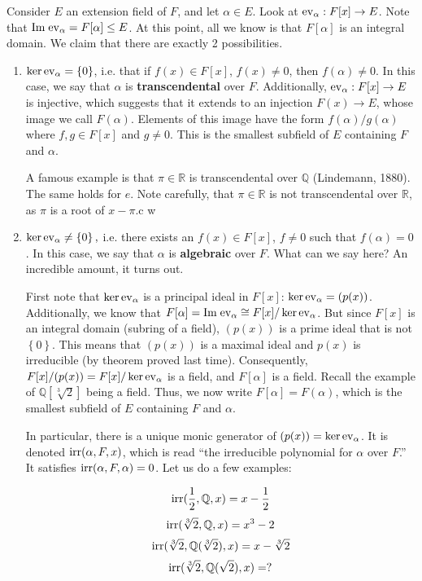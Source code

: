 \documentclass{../mathnotes}
\begin{document}
Consider $E$ an extension field of $F$, and let $\alpha\in E$. Look at ${\rm ev}_\alpha: F[x]\to E$. Note that ${\rm Im\;} {\rm ev}_\alpha=F[\alpha]\leq E$.
At this point, all we know is that $F[\alpha]$ is an integral domain. We claim that there are exactly 2 possibilities.
\begin{enumerate}
    \item $\ker {\rm ev}_\alpha=\left\{ 0 \right\}$, i.e. that if $f(x)\in F[x]$, $f(x)\neq 0$, then $f(\alpha)\neq 0$.
        In this case, we say that $\alpha$ is \textbf{transcendental} over $F$. Additionally, ${\rm ev}_\alpha:F[x]\to E$
        is injective, which suggests that it extends to an injection $F(x)\to E$, whose image we call $F(\alpha)$. Elements
        of this image have the form $f(\alpha)/g(\alpha)$ where $f,g\in F[x]$ and $g\neq 0$. This is the smallest subfield of
        $E$ containing $F$ and $\alpha$.

        A famous example is that $\pi \in \mathbb{R}$ is transcendental over $\mathbb{Q}$ (Lindemann, 1880). The same holds
        for $e$. Note carefully, that $\pi\in \mathbb{R}$ is not transcendental over $\mathbb{R}$, as $\pi$ is a root of $x-\pi$.c w
    \item $\ker {\rm ev}_\alpha\neq \left\{ 0 \right\},$ i.e. there exists an $f(x)\in F[x]$, $f\neq 0$ such that $f(\alpha)=0$.
        In this case, we say that $\alpha$ is \textbf{algebraic} over $F$. What can we say here? An incredible amount, it turns out.

        First note that $\ker {\rm ev}_\alpha$ is a principal ideal in $F[x]$: $\ker {\rm ev}_\alpha=(p(x))$. Additionally,
        we know that $F[\alpha]={\rm Im\;}{\rm ev}_\alpha\cong F[x]/\ker{\rm ev}_\alpha$. But since $F[x]$ is an integral domain
        (subring of a field), $(p(x))$ is a prime ideal that is not $\left\{ 0 \right\}$. This means that $(p(x))$ is a maximal ideal
        and $p(x)$ is irreducible (by theorem proved last time). Consequently, $F[x]/(p(x))=F[x]/\ker{\rm ev}_\alpha$ is a field, and
        $F[\alpha]$ is a field. Recall the example of $\mathbb{Q}[\sqrt[3]{2}]$ being a field. Thus, we now write $F[\alpha]=F(\alpha)$,
        which is the smallest subfield of $E$ containing $F$ and $\alpha$.

        In particular, there is a unique monic generator of $(p(x))=\ker{\rm ev}_\alpha$. It is denoted $\operatorname{irr}(\alpha,F,x)$, which
        is read ``the irreducible polynomial for $\alpha$ over $F$.'' It satisfies $\operatorname{irr}(\alpha,F,\alpha)=0$. Let us do a few examples:
        \begin{exmp}
            \[\operatorname{irr}(\frac{1}{2},\mathbb{Q},x)=x-\frac{1}{2}\]
            \[\operatorname{irr}(\sqrt[3]{2},\mathbb{Q},x)=x^3-2\]
            \[\operatorname{irr}(\sqrt[3]{2},\mathbb{Q}(\sqrt[3]{2}),x)=x-\sqrt[3]{2}\]
            \[\operatorname{irr}(\sqrt[3]{2},\mathbb{Q}(\sqrt{2}),x)=?\]
        \end{exmp}


\end{enumerate}
\end{document}
